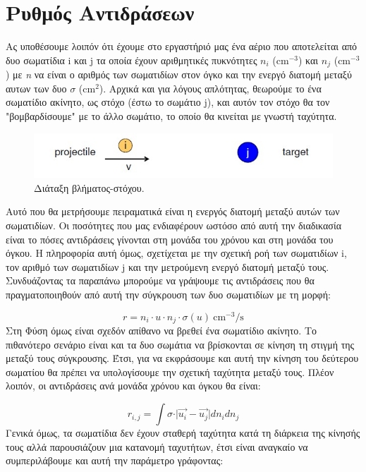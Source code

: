\section{Ρυθμός Αντιδράσεων}
Aς υποθέσουμε λοιπόν ότι έχουμε στο εργαστήριό μας ένα αέριο που αποτελείται από δυο σωματίδια i και j τα οποία έχουν αριθμητικές πυκνότητες $n_{i}$ (cm$^{-3}$) και $n_{j}$ (cm$^{-3}$) με \textit{n} να είναι ο αριθμός των σωματιδίων στον όγκο και την ενεργό διατομή μεταξύ αυτων των δυο $\sigma$ (cm$^{2}$). Αρχικά και για λόγους απλότητας, θεωρούμε το ένα σωματίδιο ακίνητο, ως στόχο (έστω το σωμάτιο j), και αυτόν τον στόχο θα τον "βομβαρδίσουμε" με το άλλο σωμάτιο, το οποίο θα κινείται με γνωστή ταχύτητα. 

\begin{figure}[h!]
    \centering
    \includegraphics[scale=0.6]{Figures/target.jpg}  
    \caption{Διάταξη βλήματος-στόχου.}
    \label{fig:apx:target_projectile}
\end{figure} 

Aυτό που θα μετρήσουμε πειραματικά είναι η ενεργός διατομή μεταξύ αυτών των σωματιδίων. Οι ποσότητες που μας ενδιαφέρουν ωστόσο από αυτή την διαδικασία είναι το πόσες αντιδράσεις γίνονται στη μονάδα του χρόνου και στη μονάδα του όγκου. Η πληροφορία αυτή όμως, σχετίχεται με την σχετική ροή των σωματιδίων i, τον αριθμό των σωματιδίων j και την μετρούμενη ενεργό διατομή μεταξύ τους. Συνδυάζοντας τα παραπάνω μπορούμε να γράψουμε τις αντιδράσεις που θα πραγματοποιηθούν από αυτή την σύγκρουση των δυο σωματιδίων με τη μορφή:

\begin{equation}
\label{eq51}
r = n_{i}\cdot u \cdot n_{j}\cdot \sigma (u) \ \text{cm}^{-3}\text{/s}
\end{equation}
Στη Φύση όμως είναι σχεδόν απίθανο να βρεθεί ένα σωματίδιο ακίνητο. Το πιθανότερο σενάριο είναι και τα δυο σωμάτια να βρίσκονται σε κίνηση τη στιγμή της μεταξύ τους σύγκρουσης. Έτσι, για να εκφράσουμε  και αυτή την κίνηση του δεύτερου σωματίου θα πρέπει να υπολογίσουμε την σχετική ταχύτητα μεταξύ τους. Πλέον λοιπόν, οι αντιδράσεις ανά μονάδα χρόνου και όγκου θα είναι:

\begin{equation}
\label{eq52}
r_{i,j}= \int \sigma\cdot \vert \vec{u_{i}}- \vec{u_{j}} \vert dn_{i}dn_{j}
\end{equation}
Γενικά όμως, τα σωματίδια δεν έχουν σταθερή ταχύτητα κατά τη διάρκεια της κίνησής τους αλλά παρουσιάζουν μια κατανομή ταχυτήτων, έτσι είναι αναγκαίο να συμπεριλάβουμε και αυτή την παράμετρο γράφοντας:

